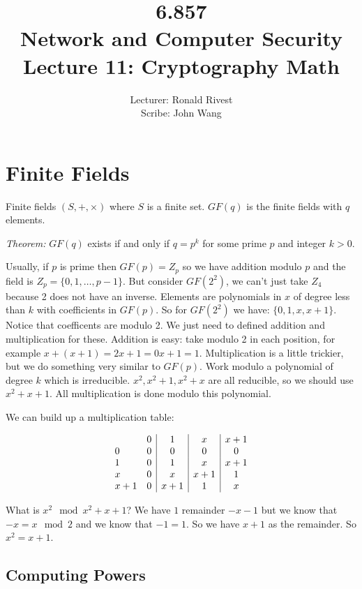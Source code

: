 \documentclass[psamsfonts]{amsart}
\title{6.857 \\
Network and Computer Security \\
Lecture 11: Cryptography Math}
\author{Lecturer: Ronald Rivest\\
Scribe: John Wang}
\begin{document}
\maketitle

\section{Finite Fields}

Finite fields $(S, +, \times)$ where $S$ is a finite set. $GF(q)$ is the finite fields with $q$ elements.

\emph{Theorem:} $GF(q)$ exists if and only if $q = p^k$ for some prime $p$ and integer $k > 0$.

Usually, if $p$ is prime then $GF(p) = Z_p$ so we have addition modulo $p$ and the field is $Z_{p} = \{0, 1, \ldots, p-1\}$. But consider $GF(2^2)$, we can't just take $Z_{4}$ because 2 does not have an inverse. Elements are polynomials in $x$ of degree less than $k$ with coefficients in $GF(p)$. So for $GF(2^2)$ we have: $\{0, 1, x, x+1 \}$. Notice that coefficents are modulo 2. We just need to defined addition and multiplication for these. Addition is easy: take modulo 2 in each position, for example $x + (x+1) = 2x + 1 = 0x + 1 = 1$. Multiplication is a little trickier, but we do something very similar to $GF(p)$. Work modulo a polynomial of degree $k$ which is irreducible. $x^2, x^2 + 1, x^2 + x$ are all reducible, so we should use $x^2 + x + 1$. All multiplication is done modulo this polynomial.

We can build up a multiplication table:

\begin{eqnarray}
  \begin{array}{l c | c | c | c}
    & 0 & 1 & x & x+1 \\
  0 & 0 & 0 & 0 & 0 \\
  1 & 0 & 1 & x & x + 1 \\
  x & 0 & x & x+1 & 1 \\
x+1 & 0 & x +1 & 1 & x
  \end{array}
\end{eqnarray}

What is $x^2 \mod {x^2 + x + 1}$? We have $1$ remainder $-x -1$ but we know that $-x = x \mod{2}$ and we know that $-1 = 1$. So we have $x+1$ as the remainder. So $x^2 = x+1$. 

\subsection{Computing Powers}
\end{document}
